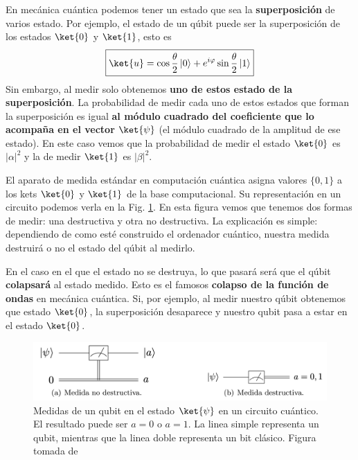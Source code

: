 \documentclass[a4paper,11pt]{book} %
\numberwithin{equation}{chapter}
\begin{document}
En mecánica cuántica podemos tener un estado que sea la \textbf{superposición} de varios estado. Por ejemplo, el estado de un qúbit puede ser la superposición de los estados $\ket{0}$ y $\ket{1}$, esto es
	\begin{equation}
	\boxed{\ket{u} = \cos{\frac{\theta}{2}}\, |0\rangle + e^{i\varphi}\sin{\frac{\theta}{2}}\,|1\rangle }
	\end{equation}
Sin embargo, al medir solo obtenemos \textbf{uno de estos estado de la superposición}. La probabilidad de medir cada uno de estos estados que forman la superposición es igual 	\textbf{al módulo cuadrado del coeficiente que lo acompaña en el vector}  $\ket{\psi}$ (el módulo cuadrado de la amplitud de ese estado). En este caso vemos que la probabilidad de medir el estado $\ket{0}$ es $|\alpha|^2$ y la de medir $\ket{1}$ es $|\beta|^2$.


El aparato de medida estándar en computación cuántica asigna valores $\{0,1\}$ a los kets $\ket{0}$ y $\ket{1}$ de la base computacional. Su representación en un circuito podemos verla en la Fig. \ref{Fig_medidas1_cubit_meter}. En esta figura vemos que tenemos dos formas de medir: una destructiva y otra no destructiva. La explicación es simple: dependiendo de como esté construido el ordenador cuántico, nuestra medida destruirá o no el estado del qúbit al medirlo. 

En el caso en el que el estado no se destruya, lo que pasará será que el qúbit \textbf{colapsará} al estado medido. Esto es el famosos \textbf{colapso de la función de ondas} en mecánica cuántica. Si, por ejemplo, al medir nuestro qúbit obtenemos que estado $\ket{0}$, la superposición desaparece y nuestro qubit pasa a estar en el estado $\ket{0}$.


	\begin{figure}[H]
	\centering 
	\includegraphics[width=0.7\linewidth]{Figuras/Fig_subfig_medidas1_cubit_meter.png}
	\caption{Medidas de un qubit en el estado $\ket{\psi}$ en un circuito cuántico. El resultado puede ser $a = 0$ o $a=1$. La linea simple representa un qubit, mientras que la linea doble representa un bit clásico. Figura tomada de \cite{bib_Curso-JMas}}
	\label{Fig_medidas1_cubit_meter}
	\end{figure}
\end{document}
